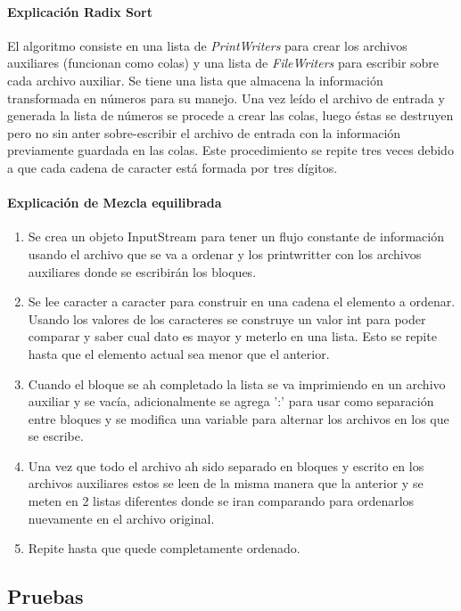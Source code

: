 \documentclass{article}
\begin{document}
	\paragraph*{Explicación Radix Sort}
	El algoritmo consiste en una lista de \textit{PrintWriters} para crear los archivos auxiliares (funcionan como colas) y una lista de \textit{FileWriters} para escribir sobre cada archivo auxiliar. Se tiene una lista que 
	almacena la información transformada en números para su manejo. Una vez leído el archivo de entrada y generada la lista de números se procede a crear las colas, luego éstas se destruyen pero no sin anter sobre-escribir el archivo de entrada con la información previamente guardada en las colas. Este procedimiento se repite tres veces debido a que cada cadena de caracter está formada por tres dígitos.
	
	\paragraph*{Explicación de Mezcla equilibrada}
	\begin{enumerate}
		\item Se crea un objeto InputStream para tener un flujo constante de información usando el archivo que se va a ordenar y los printwritter con los archivos auxiliares donde se escribirán los bloques.
		\item Se lee caracter a caracter para construir en una cadena el elemento a ordenar. Usando los valores de los caracteres se construye un valor int para poder comparar y saber cual dato es mayor y meterlo en una lista. Esto se repite hasta que el elemento actual sea menor que el anterior.
		\item Cuando el bloque se ah completado la lista se va imprimiendo en un archivo auxiliar y se vacía, adicionalmente se agrega ':' para usar como separación entre bloques y se modifica una variable para alternar los archivos en los que se escribe.
		\item Una vez que todo el archivo ah sido separado en bloques y escrito en los archivos auxiliares estos se leen de la misma manera que la anterior y se meten en 2 listas diferentes donde se iran comparando para ordenarlos nuevamente en el archivo original.
		\item Repite hasta que quede completamente ordenado.
		
	\end{enumerate}
	
	\subsection{Pruebas}
\end{document}
